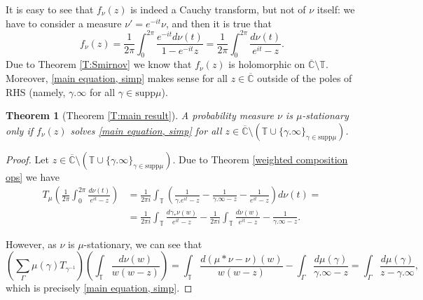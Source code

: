 \documentclass[11pt]{article}
\newtheorem{theorem}{Theorem}[section]
\begin{document}
It is easy to see that $f_\nu(z)$ is indeed a Cauchy transform, but not of $\nu$ itself: we have to consider a measure $\nu' = e^{-it} \nu$, and then it is true that
\[
f_\nu(z) = \frac{1}{2 \pi} \int_{0}^{2\pi} \frac{e^{-it} d\nu(t)}{1 - e^{-it} z} = \frac{1}{2 \pi} \int_{0}^{2 \pi} \frac{d\nu(t)}{e^{it} -  z}.
\]
Due to Theorem \ref{T:Smirnov} we know that $f_\nu(z)$ is holomorphic on $\overline{\mathbb{C}} \setminus \mathbb{T}$. Moreover, \eqref{main equation, simp} makes sense for all $z \in \overline{\mathbb{C}}$ outside of the poles of RHS (namely, $\gamma.\infty$ for all $\gamma \in \text{supp} \mu$). 

\begin{theorem}[Theorem \ref{T:main result}]
	\label{T:Cauchy transform solves main eq}
	A probability measure $\nu$ is $\mu$-stationary only if $f_\nu(z)$ solves \eqref{main equation, simp} for all $z \in \overline{\mathbb{C}} \setminus (\mathbb{T} \cup \{\gamma.\infty\}_{\gamma \in \text{supp} \mu} )$.
\end{theorem}
\begin{proof}
	Let $z \in \overline{\mathbb{C}} \setminus (\mathbb{T} \cup \{\gamma.\infty\}_{\gamma \in \text{supp} \mu} )$. Due to Theorem \ref{weighted composition ops} we have
	\[
	\begin{aligned}
		T_\mu \left( \frac{1}{2 \pi} \int_{0}^{2 \pi} \frac{d\nu(t)}{e^{it} -  z} \right) &= \frac{1}{2 \pi i}  \int_{\mathbb{T}} \left(  \frac{1}{\gamma.e^{it} -  z} - \frac{1}{\gamma.\infty - z} - \frac{1}{e^{it} -  z} \right)  d \nu(t) = \\ 
		&= \frac{1}{2 \pi i}  \int_{\mathbb{T}} \frac{d \gamma_* \nu(w)}{e^{it} -  z}  -  \frac{1}{2 \pi i}\int_{\mathbb{T}} \frac{d \nu(w)}{e^{it} -  z}  - \frac{1}{\gamma.\infty - z} .
	\end{aligned}
	\]
	
	However, as $\nu$ is $\mu$-stationary, we can see that
	\[
	\left( \sum_\Gamma \mu(\gamma) T_{\gamma^{-1}} \right) \left(  \int_{\mathbb{T}} \frac{d \nu(w)}{w(w - z)} \right)  = \int_{\mathbb{T}} \frac{d (\mu * \nu - \nu) (w)}{w(w - z)}  - \int_\Gamma \frac{d \mu(\gamma)}{\gamma.\infty - z} = \int_\Gamma \frac{d \mu(\gamma)}{z - \gamma.\infty},
	\]
	which is precisely \eqref{main equation, simp}.
\end{proof}
\end{document}
